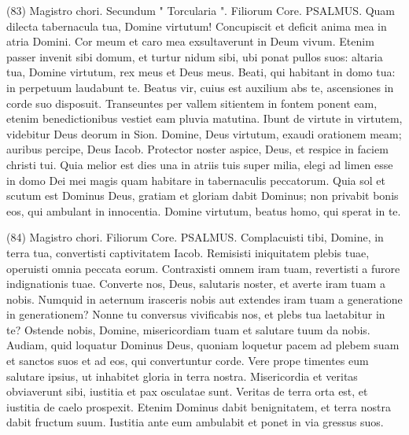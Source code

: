 \begin{biblechapter}  (83) 
\verse  Magistro chori. Secundum " Torcularia ". Filiorum Core. PSALMUS. 
\verse Quam dilecta tabernacula tua, Domine virtutum! 
\verse Concupiscit et deficit anima mea in atria Domini. Cor meum et caro mea exsultaverunt in Deum vivum. 
\verse Etenim passer invenit sibi domum, et turtur nidum sibi, ubi ponat pullos suos: altaria tua, Domine virtutum, rex meus et Deus meus. 
\verse Beati, qui habitant in domo tua: in perpetuum laudabunt te. 
\verse Beatus vir, cuius est auxilium abs te, ascensiones in corde suo disposuit. 
\verse Transeuntes per vallem sitientem in fontem ponent eam, etenim benedictionibus vestiet eam pluvia matutina. 
\verse Ibunt de virtute in virtutem, videbitur Deus deorum in Sion. 
\verse Domine, Deus virtutum, exaudi orationem meam; auribus percipe, Deus Iacob. 
\verse Protector noster aspice, Deus, et respice in faciem christi tui. 
\verse Quia melior est dies una in atriis tuis super milia, elegi ad limen esse in domo Dei mei magis quam habitare in tabernaculis peccatorum. 
\verse Quia sol et scutum est Dominus Deus, gratiam et gloriam dabit Dominus; non privabit bonis eos, qui ambulant in innocentia. 
\verse Domine virtutum, beatus homo, qui sperat in te. 
\end{biblechapter}

\begin{biblechapter}  (84) 
\verse  Magistro chori. Filiorum Core. PSALMUS. 
\verse Complacuisti tibi, Domine, in terra tua, convertisti captivitatem Iacob. 
\verse Remisisti iniquitatem plebis tuae, operuisti omnia peccata eorum. 
\verse Contraxisti omnem iram tuam, revertisti a furore indignationis tuae. 
\verse Converte nos, Deus, salutaris noster, et averte iram tuam a nobis. 
\verse Numquid in aeternum irasceris nobis aut extendes iram tuam a generatione in generationem? 
\verse Nonne tu conversus vivificabis nos, et plebs tua laetabitur in te? 
\verse Ostende nobis, Domine, misericordiam tuam et salutare tuum da nobis. 
\verse Audiam, quid loquatur Dominus Deus, quoniam loquetur pacem ad plebem suam et sanctos suos et ad eos, qui convertuntur corde. 
\verse Vere prope timentes eum salutare ipsius, ut inhabitet gloria in terra nostra. 
\verse Misericordia et veritas obviaverunt sibi, iustitia et pax osculatae sunt. 
\verse Veritas de terra orta est, et iustitia de caelo prospexit. 
\verse Etenim Dominus dabit benignitatem, et terra nostra dabit fructum suum. 
\verse Iustitia ante eum ambulabit et ponet in via gressus suos. 
\end{biblechapter}

